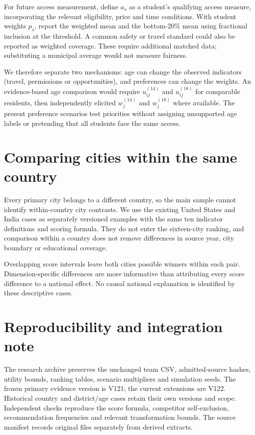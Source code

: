 \documentclass[12pt]{article}
\begin{document}
For future access measurement, define $a_s$ as a student's qualifying access
measure, incorporating the relevant eligibility, price and time conditions.
With student weights $p_s$, report the weighted mean and the bottom-20\%
mean using fractional inclusion at the threshold. A common safety or travel
standard could also be reported as weighted coverage. These require additional
matched data; substituting a municipal average would not measure fairness.

\AgeCase
We therefore separate two mechanisms: age can change the observed indicators
(travel, permissions or opportunities), and preferences can change the weights.
An evidence-based age comparison would require $u_{ij}^{(14)}$ and
$u_{ij}^{(18)}$ for comparable residents, then independently elicited
$w_j^{(14)}$ and $w_j^{(18)}$ where available. The present preference scenarios
test priorities without assigning unsupported age labels or pretending that
all students face the same access.

\section{Comparing cities within the same country}
Every primary city belongs to a different country, so the main sample cannot
identify within-country city contrasts. We use the existing United States and
India cases as separately versioned examples with the same ten indicator
definitions and scoring formula. They do not enter the sixteen-city ranking,
and comparison within a country does not remove differences in source year,
city boundary or educational coverage.



\CountryInterpretation
Overlapping score intervals leave both cities possible winners within each
pair. Dimension-specific differences are more informative than attributing
every score difference to a national effect. No causal national explanation is
identified by these descriptive cases.

\section*{Reproducibility and integration note}
The research archive preserves the unchanged team CSV, admitted-source hashes,
utility bounds, ranking tables, scenario multipliers and simulation seeds.
The frozen primary evidence version is V121; the current extensions are V122.
Historical country and district/age cases retain their own versions and scope.
Independent checks reproduce the score formula, competitor self-exclusion,
recommendation frequencies and relevant transformation bounds. The source
manifest records original files separately from derived extracts.
\end{document}
